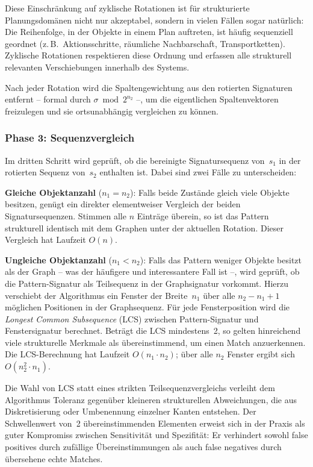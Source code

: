 ﻿\documentclass[a4paper,12pt]{article}
\theoremstyle{definition}
\begin{document}
Diese Einschränkung auf zyklische Rotationen ist für strukturierte Planungsdomänen nicht nur akzeptabel, sondern in vielen Fällen sogar natürlich: Die Reihenfolge, in der Objekte in einem Plan auftreten, ist häufig sequenziell geordnet (z.\,B.\ Aktionsschritte, räumliche Nachbarschaft, Transportketten). Zyklische Rotationen respektieren diese Ordnung und erfassen alle strukturell relevanten Verschiebungen innerhalb des Systems.

Nach jeder Rotation wird die Spaltengewichtung aus den rotierten Signaturen entfernt -- formal durch $\sigma \bmod 2^{n_2}$ --, um die eigentlichen Spaltenvektoren freizulegen und sie ortsunabhängig vergleichen zu können.

\subsubsection*{Phase 3: Sequenzvergleich}

Im dritten Schritt wird geprüft, ob die bereinigte Signatursequenz von~$s_1$ in der rotierten Sequenz von~$s_2$ enthalten ist. Dabei sind zwei Fälle zu unterscheiden:

\textbf{Gleiche Objektanzahl} ($n_1 = n_2$): Falls beide Zustände gleich viele Objekte besitzen, genügt ein direkter elementweiser Vergleich der beiden Signatursequenzen. Stimmen alle $n$ Einträge überein, so ist das Pattern strukturell identisch mit dem Graphen unter der aktuellen Rotation. Dieser Vergleich hat Laufzeit $O(n)$.

\textbf{Ungleiche Objektanzahl} ($n_1 < n_2$): Falls das Pattern weniger Objekte besitzt als der Graph -- was der häufigere und interessantere Fall ist --, wird geprüft, ob die Pattern-Signatur als Teilsequenz in der Graphsignatur vorkommt. Hierzu verschiebt der Algorithmus ein Fenster der Breite~$n_1$ über alle $n_2 - n_1 + 1$ möglichen Positionen in der Graphsequenz. Für jede Fensterposition wird die \emph{Longest Common Subsequence} (LCS) zwischen Pattern-Signatur und Fenstersignatur berechnet. Beträgt die LCS mindestens~2, so gelten hinreichend viele strukturelle Merkmale als übereinstimmend, um einen Match anzuerkennen. Die LCS-Berechnung hat Laufzeit $O(n_1 \cdot n_2)$; über alle $n_2$ Fenster ergibt sich $O(n_2^2 \cdot n_1)$.

Die Wahl von LCS statt eines strikten Teilsequenzvergleichs verleiht dem Algorithmus Toleranz gegenüber kleineren strukturellen Abweichungen, die aus Diskretisierung oder Umbenennung einzelner Kanten entstehen. Der Schwellenwert von~2 übereinstimmenden Elementen erweist sich in der Praxis als guter Kompromiss zwischen Sensitivität und Spezifität: Er verhindert sowohl false positives durch zufällige Übereinstimmungen als auch false negatives durch übersehene echte Matches.
\end{document}
